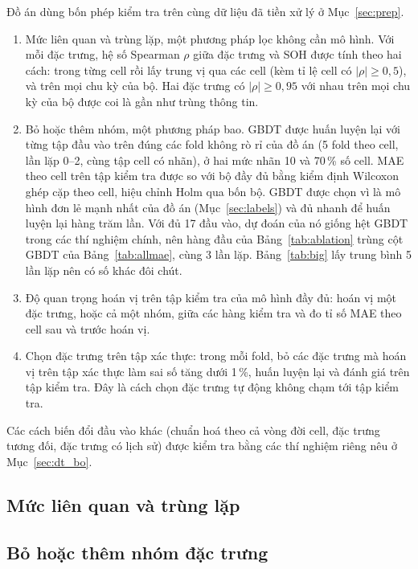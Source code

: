 Đồ án dùng bốn phép kiểm tra trên cùng dữ liệu đã tiền xử lý ở Mục~\ref{sec:prep}.
\begin{enumerate}
\item Mức liên quan và trùng lặp, một phương pháp lọc không cần mô hình. Với mỗi đặc trưng, hệ số Spearman $\rho$ giữa
      đặc trưng và SOH được tính theo hai cách: trong từng cell rồi lấy trung vị qua các cell (kèm tỉ lệ cell có
      $|\rho| \ge 0{,}5$), và trên mọi chu kỳ của bộ. Hai đặc trưng có $|\rho| \ge 0{,}95$ với nhau trên mọi chu kỳ của
      bộ được coi là gần như trùng thông tin.
\item Bỏ hoặc thêm nhóm, một phương pháp bao. GBDT được huấn luyện lại với từng tập đầu vào trên đúng các fold không rò rỉ
      của đồ án (5 fold theo cell, lần lặp 0--2, cùng tập cell có nhãn), ở hai mức nhãn 10 và 70\,\% số cell. MAE theo
      cell trên tập kiểm tra được so với bộ đầy đủ bằng kiểm định Wilcoxon ghép cặp theo cell, hiệu chỉnh Holm qua bốn
      bộ. GBDT được chọn vì là mô hình đơn lẻ mạnh nhất của đồ án (Mục~\ref{sec:labels}) và đủ nhanh để huấn luyện lại
      hàng trăm lần. Với đủ 17 đầu vào, dự đoán của nó giống hệt GBDT trong các thí nghiệm chính, nên hàng đầu của
      Bảng~\ref{tab:ablation} trùng cột GBDT của Bảng~\ref{tab:allmae}, cùng 3 lần lặp. Bảng~\ref{tab:big} lấy trung bình
      5 lần lặp nên có số khác đôi chút.
\item Độ quan trọng hoán vị trên tập kiểm tra của mô hình đầy đủ: hoán vị một đặc trưng, hoặc cả một nhóm, giữa các hàng
      kiểm tra và đo tỉ số MAE theo cell sau và trước hoán vị.
\item Chọn đặc trưng trên tập xác thực: trong mỗi fold, bỏ các đặc trưng mà hoán vị trên tập xác thực làm sai số tăng
      dưới 1\,\%, huấn luyện lại và đánh giá trên tập kiểm tra. Đây là cách chọn đặc trưng tự động không chạm tới tập
      kiểm tra.
\end{enumerate}
Các cách biến đổi đầu vào khác (chuẩn hoá theo cả vòng đời cell, đặc trưng tương đối, đặc trưng có lịch sử) được kiểm tra
bằng các thí nghiệm riêng nêu ở Mục~\ref{sec:dt_bo}.

\subsection{Mức liên quan và trùng lặp}\label{sec:dt_lienquan}



\subsection{Bỏ hoặc thêm nhóm đặc trưng}\label{sec:dt_bonhom}

